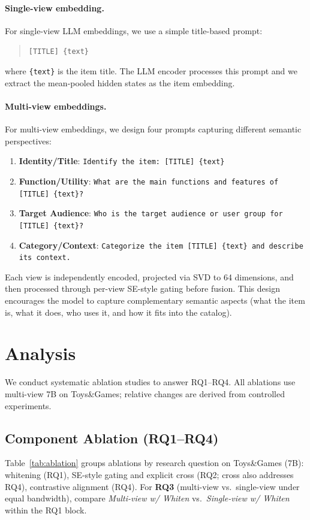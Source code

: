 \documentclass[sigconf,natbib=true,anonymous]{acmart}
\begin{document}
\paragraph{Single-view embedding.}
For single-view LLM embeddings, we use a simple title-based
prompt:
\begin{quote}
\texttt{[TITLE] \{text\}}
\end{quote}
where \texttt{\{text\}} is the item title. The LLM encoder
processes this prompt and we extract the mean-pooled hidden
states as the item embedding.

\paragraph{Multi-view embeddings.}
For multi-view embeddings, we design four prompts capturing
different semantic perspectives:
\begin{enumerate}[leftmargin=*,itemsep=1pt]
  \item \textbf{Identity/Title}:
    \texttt{Identify the item: [TITLE] \{text\}}
  \item \textbf{Function/Utility}:
    \texttt{What are the main functions and features of
    [TITLE] \{text\}?}
  \item \textbf{Target Audience}:
    \texttt{Who is the target audience or user group for
    [TITLE] \{text\}?}
  \item \textbf{Category/Context}:
    \texttt{Categorize the item [TITLE] \{text\} and describe
    its context.}
\end{enumerate}
Each view is independently encoded, projected via SVD to 64
dimensions, and then processed through per-view SE-style gating
before fusion.
This design encourages the model to capture complementary
semantic aspects (what the item is, what it does, who uses
it, and how it fits into the catalog).

\section{Analysis}\label{sec:analysis}

We conduct systematic ablation studies to answer RQ1--RQ4.
All ablations use multi-view 7B on Toys\&Games; relative changes
are derived from controlled experiments.
\subsection{Component Ablation (RQ1--RQ4)}

Table~\ref{tab:ablation} groups ablations by research question on
Toys\&Games (7B): whitening (RQ1), SE-style gating and explicit cross
(RQ2; cross also addresses RQ4), contrastive alignment (RQ4).
For \textbf{RQ3} (multi-view vs.\ single-view under equal bandwidth),
compare \emph{Multi-view w/ Whiten} vs.\ \emph{Single-view w/ Whiten}
within the RQ1 block.
\end{document}
